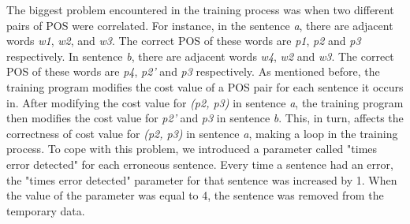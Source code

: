 \documentclass[english]{nlp}
\begin{document}
The biggest problem encountered in the training process was when two 
different pairs of POS were correlated. 
For instance, in the sentence {\it a}, there are adjacent words {\it w1}, {\it w2}, and {\it w3}.
The correct POS of these words are {\it p1}, {\it p2} and {\it p3} respectively.
In sentence {\it b}, there are adjacent words {\it w4}, {\it w2} and {\it w3}.
The correct POS of these words are {\it p4}, {\it p2'} and {\it p3} respectively.
As mentioned before, the training program modifies the cost value of a POS pair
for each sentence it occurs in. 
After modifying the cost value for {\it (p2, p3)} in sentence {\it a}, the training
program then modifies the cost value for {\it p2'} and {\it p3} in sentence {\it b}.
This, in turn, affects the correctness of cost value for {\it (p2, p3)} in sentence
{\it a}, making a loop in the training process.
To cope with this problem, we introduced a parameter called "times error detected"
for each erroneous sentence. Every time a sentence had an error, the
"times error detected" parameter for that sentence was increased by 1. 
When the value of the parameter was equal to 4, the sentence was 
removed from the temporary data.
\end{document}
